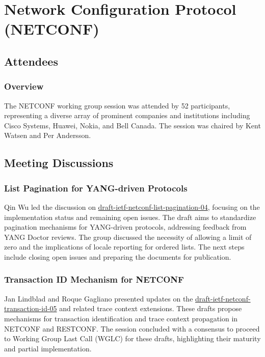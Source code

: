 \documentclass{article}
\begin{document}
\section{Network Configuration Protocol (NETCONF)}

\subsection{Attendees}
\subsubsection{Overview}
The NETCONF working group session was attended by 52 participants, representing a diverse array of prominent companies and institutions including Cisco Systems, Huawei, Nokia, and Bell Canada. The session was chaired by Kent Watsen and Per Andersson.

\subsection{Meeting Discussions}

\subsubsection{List Pagination for YANG-driven Protocols}
Qin Wu led the discussion on \href{https://datatracker.ietf.org/doc/html/draft-ietf-netconf-list-pagination-04}{draft-ietf-netconf-list-pagination-04}, focusing on the implementation status and remaining open issues. The draft aims to standardize pagination mechanisms for YANG-driven protocols, addressing feedback from YANG Doctor reviews. The group discussed the necessity of allowing a limit of zero and the implications of locale reporting for ordered lists. The next steps include closing open issues and preparing the documents for publication.

\subsubsection{Transaction ID Mechanism for NETCONF}
Jan Lindblad and Roque Gagliano presented updates on the \href{https://datatracker.ietf.org/doc/html/draft-ietf-netconf-transaction-id-05}{draft-ietf-netconf-transaction-id-05} and related trace context extensions. These drafts propose mechanisms for transaction identification and trace context propagation in NETCONF and RESTCONF. The session concluded with a consensus to proceed to Working Group Last Call (WGLC) for these drafts, highlighting their maturity and partial implementation.
\end{document}
